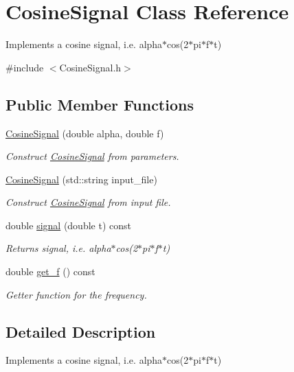 \hypertarget{classCosineSignal}{}\section{Cosine\+Signal Class Reference}
\label{classCosineSignal}


Implements a cosine signal, i.\+e. alpha$\ast$cos(2$\ast$pi$\ast$f$\ast$t)  




{\ttfamily \#include $<$Cosine\+Signal.\+h$>$}

\subsection*{Public Member Functions}
\begin{DoxyCompactItemize}
\item 
\hyperlink{classCosineSignal_a410237bec2f4171534e04f5a04259c98}{Cosine\+Signal} (double alpha, double f)
\begin{DoxyCompactList}\small\item\em Construct \hyperlink{classCosineSignal}{Cosine\+Signal} from parameters. \end{DoxyCompactList}\item 
\hyperlink{classCosineSignal_a60c5a9cc2d1ed9b8543cdf51f1a3a44a}{Cosine\+Signal} (std\+::string input\+\_\+file)
\begin{DoxyCompactList}\small\item\em Construct \hyperlink{classCosineSignal}{Cosine\+Signal} from input file. \end{DoxyCompactList}\item 
double \hyperlink{classCosineSignal_a541f39de155f6a92162882ce102480bd}{signal} (double t) const
\begin{DoxyCompactList}\small\item\em Returns signal, i.\+e. alpha$\ast$cos(2$\ast$pi$\ast$f$\ast$t) \end{DoxyCompactList}\item 
double \hyperlink{classCosineSignal_ae4d286b605aa34aca31619f121fe0b41}{get\+\_\+f} () const
\begin{DoxyCompactList}\small\item\em Getter function for the frequency. \end{DoxyCompactList}\end{DoxyCompactItemize}


\subsection{Detailed Description}
Implements a cosine signal, i.\+e. alpha$\ast$cos(2$\ast$pi$\ast$f$\ast$t) 

